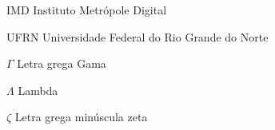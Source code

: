 \documentclass[
    12pt,				%
	oneside,            %
	a4paper,			%
	english,			%
	french,
	spanish,
	brazil				%
	]{abntex2}
\begin{document}
\begin{siglas}
  \item[IMD] Instituto Metrópole Digital
  \item[UFRN] Universidade Federal do Rio Grande do Norte
\end{siglas}

\begin{simbolos}
  \item[$\Gamma$] Letra grega Gama
  \item[$\Lambda$] Lambda
  \item[$\zeta$] Letra grega minúscula zeta
\end{simbolos}

\tableofcontents*
\clearpage


\textual



\postextual



\end{document}
